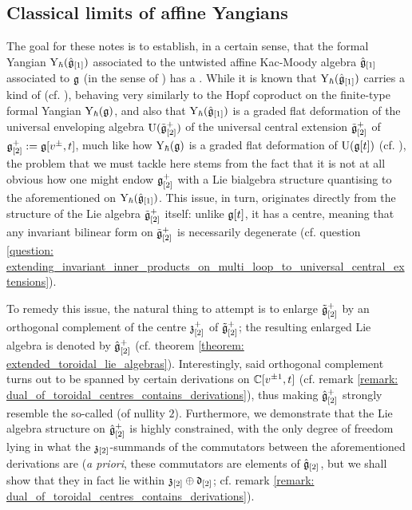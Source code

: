        \subsection{Classical limits of affine Yangians}
            The goal for these notes is to establish, in a certain sense, that the formal Yangian $\mathrm{Y}_{\hbar}(\hat{\mathfrak{g}}_{[1]})$ associated to the untwisted affine Kac-Moody algebra $\hat{\mathfrak{g}}_{[1]}$ associated to $\mathfrak{g}$ (in the sense of \cite[Chapter 7]{kac_infinite_dimensional_lie_algebras}) has a . While it is known that $\mathrm{Y}_{\hbar}(\hat{\mathfrak{g}}_{[1]})$ carries a kind of  (cf. \cite{guay_nakajima_wendlandt_affine_yangian_coproduct}), behaving very similarly to the Hopf coproduct on the finite-type formal Yangian $\mathrm{Y}_{\hbar}(\mathfrak{g})$, and also that $\mathrm{Y}_{\hbar}(\hat{\mathfrak{g}}_{[1]})$ is a graded flat deformation of the universal enveloping algebra $\mathrm{U}(\tilde{\mathfrak{g}}_{[2]}^+)$ of the universal central extension $\tilde{\mathfrak{g}}_{[2]}^+$ of $\mathfrak{g}_{[2]}^+ := \mathfrak{g}[v^{\pm}, t]$, much like how $\mathrm{Y}_{\hbar}(\mathfrak{g})$ is a graded flat deformation of $\mathrm{U}(\mathfrak{g}[t])$ (cf. \cite{chari_pressley_quantum_groups}), the problem that we must tackle here stems from the fact that it is not at all obvious how one might endow $\mathfrak{g}_{[2]}^+$ with a Lie bialgebra structure quantising to the aforementioned  on $\mathrm{Y}_{\hbar}(\hat{\mathfrak{g}}_{[1]})$. This issue, in turn, originates directly from the structure of the Lie algebra $\tilde{\mathfrak{g}}_{[2]}^+$ itself: unlike $\mathfrak{g}[t]$, it has a centre, meaning that any invariant bilinear form on $\tilde{\mathfrak{g}}_{[2]}^+$ is necessarily degenerate (cf. question \ref{question: extending_invariant_inner_products_on_multi_loop_to_universal_central_extensions}).

            To remedy this issue, the natural thing to attempt is to enlarge $\tilde{\mathfrak{g}}_{[2]}^+$ by an orthogonal complement of the centre $\mathfrak{z}_{[2]}^+$ of $\tilde{\mathfrak{g}}_{[2]}^+$; the resulting enlarged Lie algebra is denoted by $\hat{\mathfrak{g}}_{[2]}^+$ (cf. theorem \ref{theorem: extended_toroidal_lie_algebras}). Interestingly, said orthogonal complement turns out to be spanned by certain derivations on $\mathbb{C}[v^{\pm 1}, t]$ (cf. remark \ref{remark: dual_of_toroidal_centres_contains_derivations}), thus making $\hat{\mathfrak{g}}_{[2]}^+$ strongly resemble the so-called  (of nullity $2$). Furthermore, we demonstrate that the Lie algebra structure on $\hat{\mathfrak{g}}_{[2]}^+$ is highly constrained, with the only degree of freedom lying in what the $\mathfrak{z}_{[2]}$-summands of the commutators between the aforementioned derivations are (\textit{a priori}, these commutators are elements of $\hat{\mathfrak{g}}_{[2]}$, but we shall show that they in fact lie within $\mathfrak{z}_{[2]} \oplus \mathfrak{d}_{[2]}$; cf. remark \ref{remark: dual_of_toroidal_centres_contains_derivations}).
    
